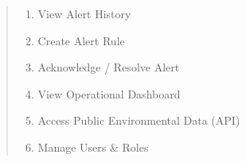 {%
%

\begin{quote}
	\begin{enumerate}[\bf BE1.]
		\item View Alert History
		\item Create Alert Rule
		\item Acknowledge / Resolve Alert
		\item View Operational Dashboard
		\item Access Public Environmental Data (API)
		\item Manage Users \& Roles
	\end{enumerate}
\end{quote}

}
